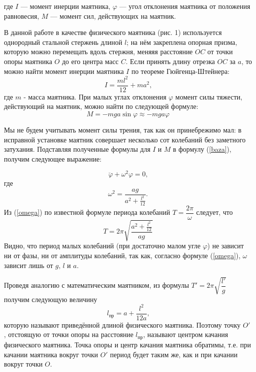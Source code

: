 \documentclass{article}
\begin{document}
где \(I\) --- момент инерции маятника, \(\varphi\) --- угол отклонения маятника от положения равновесия, \(M\) --- момент сил, действующих на маятник. \par
В данной работе в качестве физического маятника (рис. 1) используется однородный стальной стержень длиной \(l\); на нём закреплена опорная призма, которую можно перемещать вдоль стержня, меняяя расстояние \(OC\) от точки опоры маятника \(O\) до его центра масс \(C\). Если принять длину отрезка \(OC \text{ за } a \), то можно найти момент инерции маятника \(I\) по теореме Гюйгенца-Штейнера:
\[
I = \frac{ml^2}{12} + ma^2 \text{,} 
\]
где \(m\) - масса маятника. При малых углах отклонения \(\varphi\) момент силы тяжести, действующий на маятник, можно найти по следующей формуле:
\[
M = -mga\sin{\varphi} \approx -mga\varphi
\]

Мы не будем учитывать момент силы трения, так как он принебрежимо мал: в исправной установке маятник совершает несколько сот колебаний без заметного затухания. Подставляя полученные формулы для \(I\) и \(M\) в формулу (\ref{baza}), получим следующее выражение:

\begin{equation} \label{wave}
\ddot{\varphi} + \omega^2\varphi = 0 \text{,}
\end{equation}
где
\begin{equation} \label{omega}
\omega^2 = \frac{ag}{a^2+\frac{l^2}{12}} \text{.}
\end{equation} 
Из  (\ref{omega}) по известной формуле периода колебаний \(T = \dfrac{2\pi}{\omega}\) следует, что
\begin{equation} \label{period}
T = 2\pi\sqrt{\frac{a^2+\frac{l^2}{12}}{ag}}
\end{equation}
Видно, что период малых колебаний (при достаточно малом угле \(\varphi\)) не зависит ни от фазы, ни от амплитуды колебаний, так как, согласно формуле (\ref{omega}), \(\omega\) зависит лишь от \(g \text{, } l \text{ и } a\).\par
Проведя аналогию с математическим маятником, из формулы \(T' = 2\pi\sqrt{\dfrac{l'}{g}}\) получим следующую величину
\begin{equation} \label{lpr}
l_\text{пр} = a + \frac{l^2}{12a} \text{,}
\end{equation} 
которую называют приведённой длиной физического маятника. Поэтому точку $ O' $, отстоящую от точки опоры на расстояние $ l_\text{пр} $, называют центром качания физического маятника. Точка опоры и центр качания маятника обратимы, т.е. при качании маятника вокруг  точки $ O' $ период будет таким же, как и при качании вокруг точки $ O $.
\end{document}
